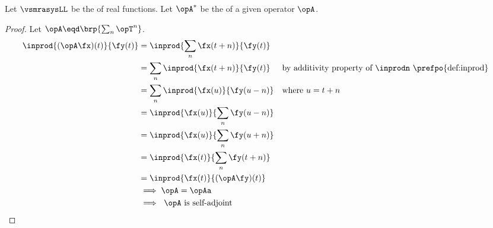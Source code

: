 \begin{proposition}
\label{prop:vsmra_real_sa}
Let $\vsmrasysLL$ be the \vsmratext of real functions.
Let $\opA^\ast$ be the  of a given operator $\opA$.
\end{proposition}
\begin{proof}
   Let $\opA\eqd\brp{\sum_n \opT^n}$. 
    \begin{align*}
      \inprod{(\opA\fx)(t)}{\fy(t)}
        &= \inprod{\sum_n \fx(t+n)}{\fy(t)}
      \\&= \sum_n \inprod{\fx(t+n)}{\fy(t)}
        && \text{by additivity property of $\inprodn$ \prefpo{def:inprod}}
      \\&= \sum_n \inprod{\fx(u)}{\fy(u-n)}
        && \text{where $u=t+n$}
      \\&= \inprod{\fx(u)}{\sum_n \fy(u-n)}
      \\&= \inprod{\fx(u)}{\sum_n \fy(u+n)}
      \\&= \inprod{\fx(t)}{\sum_n \fy(t+n)}
      \\&= \inprod{\fx(t)}{(\opA\fy)(t)}
      \\&\implies \opA=\opAa 
      \\&\implies \text{ $\opA$ is self-adjoint}
    \end{align*}
\end{proof}



